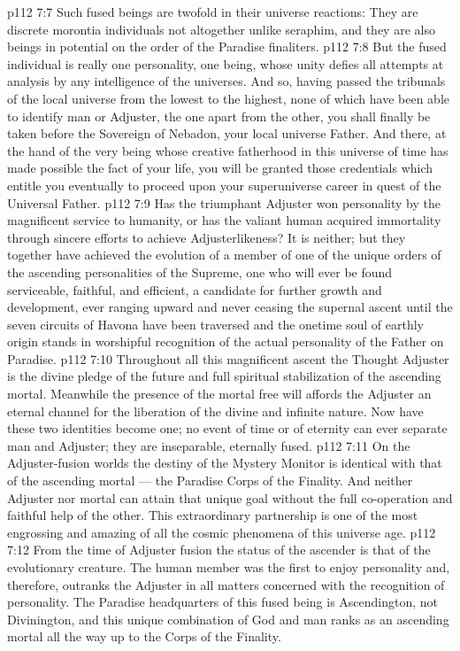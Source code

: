 \vs p112 7:7 \pc Such fused beings are twofold in their universe reactions: They are discrete morontia individuals not altogether unlike seraphim, and they are also beings in potential on the order of the Paradise finaliters.
\vs p112 7:8 But the fused individual is really one personality, one being, whose unity defies all attempts at analysis by any intelligence of the universes. And so, having passed the tribunals of the local universe from the lowest to the highest, none of which have been able to identify man or Adjuster, the one apart from the other, you shall finally be taken before the Sovereign of Nebadon, your local universe Father. And there, at the hand of the very being whose creative fatherhood in this universe of time has made possible the fact of your life, you will be granted those credentials which entitle you eventually to proceed upon your superuniverse career in quest of the Universal Father.
\vs p112 7:9 Has the triumphant Adjuster won personality by the magnificent service to humanity, or has the valiant human acquired immortality through sincere efforts to achieve Adjusterlikeness? It is neither; but they together have achieved the evolution of a member of one of the unique orders of the ascending personalities of the Supreme, one who will ever be found serviceable, faithful, and efficient, a candidate for further growth and development, ever ranging upward and never ceasing the supernal ascent until the seven circuits of Havona have been traversed and the onetime soul of earthly origin stands in worshipful recognition of the actual personality of the Father on Paradise.
\vs p112 7:10 Throughout all this magnificent ascent the Thought Adjuster is the divine pledge of the future and full spiritual stabilization of the ascending mortal. Meanwhile the presence of the mortal free will affords the Adjuster an eternal channel for the liberation of the divine and infinite nature. Now have these two identities become one; no event of time or of eternity can ever separate man and Adjuster; they are inseparable, eternally fused.
\vs p112 7:11 \pc On the Adjuster\hyp{}fusion worlds the destiny of the Mystery Monitor is identical with that of the ascending mortal --- the Paradise Corps of the Finality. And neither Adjuster nor mortal can attain that unique goal without the full co\hyp{}operation and faithful help of the other. This extraordinary partnership is one of the most engrossing and amazing of all the cosmic phenomena of this universe age.
\vs p112 7:12 From the time of Adjuster fusion the status of the ascender is that of the evolutionary creature. The human member was the first to enjoy personality and, therefore, outranks the Adjuster in all matters concerned with the recognition of personality. The Paradise headquarters of this fused being is Ascendington, not Divinington, and this unique combination of God and man ranks as an ascending mortal all the way up to the Corps of the Finality.
